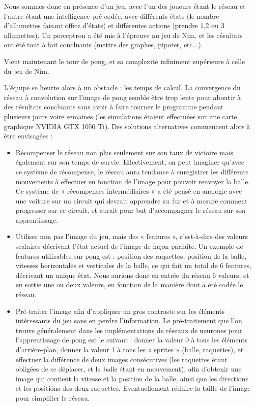 \documentclass[
    10pt,
    a4paper,
    oneside,
    headinclude,footinclude,
    BCOR=5mm,
    captions=tableabove
]{scrartcl}
\begin{document}
Nous sommes donc en présence d’un jeu, avec l’un des joueurs étant le réseau et l’autre étant une intelligence pré-codée, avec différents états (le nombre d’allumettes faisant office d’états) et différentes actions (prendre 1,2 ou 3 allumettes). Un perceptron a été mis à l’épreuve au jeu de Nim, et les résultats ont été tout à fait concluants (mettre des graphes, pipoter, etc...)

Vient maintenant le tour de pong, et sa complexité infiniment supérieure à celle du jeu de Nim.

L'équipe se heurte alors à un obstacle : les temps de calcul. La convergence du réseau à convolution sur l’image de pong semble être trop lente pour aboutir à des résultats concluants sans avoir à faire tourner le programme pendant plusieurs jours voire semaines (les simulations étaient effectuées sur une carte graphique NVIDIA GTX 1050 Ti). Des solutions alternatives commencent alors à être envisagées :
\begin{itemize}
\item Récompenser le réseau non plus seulement sur son taux de victoire mais également sur son temps de survie. Effectivement, on peut imaginer qu’avec ce système de récompense, le réseau aura tendance à enregistrer les différents mouvements à effectuer en fonction de l’image pour pouvoir renvoyer la balle.
Ce système de « récompenses intermédiaires » a été pensé en analogie avec une voiture sur un circuit qui devrait apprendre au fur et à mesure comment progresser sur ce circuit, et aurait pour but d’accompagner le réseau sur son apprentissage.  %
\item Utiliser non pas l’image du jeu, mais des « features », c’est-à-dire des valeurs scalaires décrivant l’état actuel de l’image de façon parfaite. Un exemple de features utilisables sur pong est : position des raquettes, position de la balle, vitesses horizontales et verticales de la balle, ce qui fait un total de 6 features, décrivant un unique état. Nous aurions donc en entrée du réseau 6 valeurs, et en sortie une ou deux valeurs, en fonction de la manière dont a été codée le réseau.
\item Pré-traiter l’image afin d’appliquer un gros contraste sur les éléments intéressants du jeu sans en perdre l’information. Le pré-traitement que l’on trouve généralement dans les implémentations de réseaux de neurones pour l’apprentissage de pong est le suivant : donner la valeur 0 à tous les éléments d’arrière-plan, donner la valeur 1 à tous les « sprites » (balle, raquettes), et effectuer la différence de deux images consécutives (les raquettes étant obligées de se déplacer, et la balle étant en mouvement), afin d’obtenir une image qui contient la vitesse et la position de la balle, ainsi que les directions et les positions des deux raquettes. Eventuellement réduire la taille de l’image pour simplifier le réseau.
\end{itemize}
\end{document}
